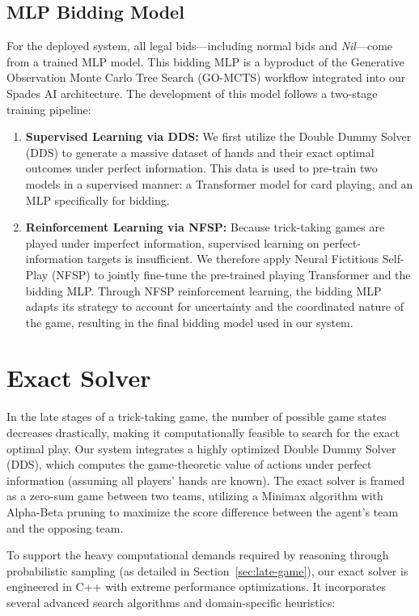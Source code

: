 \documentclass{article}
\begin{document}
\subsection{MLP Bidding Model}

For the deployed system, all legal bids---including normal bids and \textit{Nil}---come from a trained MLP model. This bidding MLP is a byproduct of the Generative Observation Monte Carlo Tree Search (GO-MCTS) workflow integrated into our Spades AI architecture. The development of this model follows a two-stage training pipeline:
\begin{enumerate}
    \item \textbf{Supervised Learning via DDS:} We first utilize the Double Dummy Solver (DDS) to generate a massive dataset of hands and their exact optimal outcomes under perfect information. This data is used to pre-train two models in a supervised manner: a Transformer model for card playing, and an MLP specifically for bidding.
    \item \textbf{Reinforcement Learning via NFSP:} Because trick-taking games are played under imperfect information, supervised learning on perfect-information targets is insufficient. We therefore apply Neural Fictitious Self-Play (NFSP) to jointly fine-tune the pre-trained playing Transformer and the bidding MLP. Through NFSP reinforcement learning, the bidding MLP adapts its strategy to account for uncertainty and the coordinated nature of the game, resulting in the final bidding model used in our system.
\end{enumerate}

\section{Exact Solver}
\label{sec:exact-solver}

In the late stages of a trick-taking game, the number of possible game states decreases drastically, making it computationally feasible to search for the exact optimal play. Our system integrates a highly optimized Double Dummy Solver (DDS), which computes the game-theoretic value of actions under perfect information (assuming all players' hands are known). The exact solver is framed as a zero-sum game between two teams, utilizing a Minimax algorithm with Alpha-Beta pruning to maximize the score difference between the agent's team and the opposing team.

To support the heavy computational demands required by reasoning through probabilistic sampling (as detailed in Section~\ref{sec:late-game}), our exact solver is engineered in C++ with extreme performance optimizations. It incorporates several advanced search algorithms and domain-specific heuristics:
\end{document}
